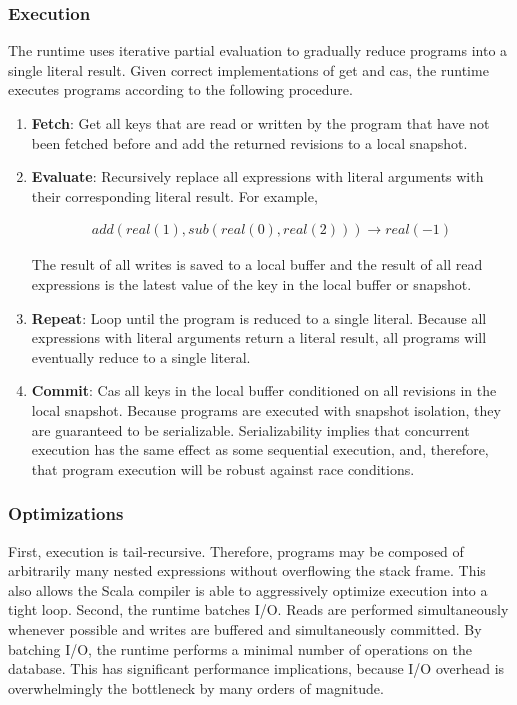 \documentclass[../main.tex]{subfiles}
\begin{document}
    \subsubsection{Execution}
    The runtime uses iterative partial evaluation to gradually reduce programs into a single literal
    result. Given correct implementations of get and cas, the runtime executes programs according to
    the following procedure.

    \begin{enumerate}
      \item \textbf{Fetch}: Get all keys that are read or written by the program that have not been
            fetched before and add the returned revisions to a local snapshot.
      \item \textbf{Evaluate}: Recursively replace all expressions with literal arguments with their
            corresponding literal result. For example,

            \[
            \begin{gathered}
            add(real(1), sub(real(0), real(2))) \rightarrow real(-1)
            \end{gathered}
            \]

            The result of all writes is saved to a local buffer and the result of all read
            expressions is the latest value of the key in the local buffer or snapshot.
      \item \textbf{Repeat}: Loop until the program is reduced to a single literal. Because all
            expressions with literal arguments return a literal result, all programs will eventually
            reduce to a single literal.
      \item \textbf{Commit}: Cas all keys in the local buffer conditioned on all revisions in
            the local snapshot. Because programs are executed with snapshot isolation, they are
            guaranteed to be serializable. Serializability implies that concurrent execution has the
            same effect as some sequential execution, and, therefore, that program execution will be
            robust against race conditions.
    \end{enumerate}

    \subsubsection{Optimizations}
    First, execution is tail-recursive. Therefore, programs may be composed of arbitrarily many
    nested expressions without overflowing the stack frame. This also allows the Scala compiler is
    able to aggressively optimize execution into a tight loop. Second, the runtime batches I/O.
    Reads are performed simultaneously whenever possible and writes are buffered and simultaneously
    committed. By batching I/O, the runtime performs a minimal number of operations on the database.
    This has significant performance implications, because I/O overhead is overwhelmingly the
    bottleneck by many orders of magnitude. \cite{io}
\end{document}
